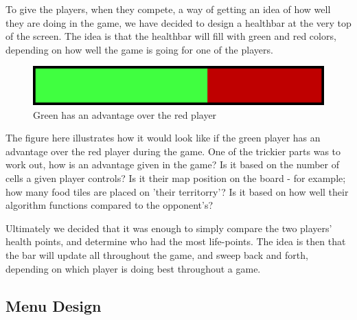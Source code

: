 To give the players, when they compete, a way of getting an idea of how well they are doing in the game, we have decided to design a healthbar at the 
very top of the screen. The idea is that the healthbar will fill with green and red colors, depending on how well the game is going for one of the 
players.

\begin{figure}[h]
	\centering
		\includegraphics{img/healthbar_example.png}
	\caption{Green has an advantage over the red player}
	\label{fig:healthbar}
\end{figure}

The figure here illustrates how it would look like if the green player has an advantage over the red player during the game. One of the trickier parts 
was to work out, how is an advantage given in the game? Is it based on the number of cells a given player controls? Is it their map position on the 
board - for example; how many food tiles are placed on 'their territorry'? Is it based on how well their algorithm functions compared to the 
opponent's? 


Ultimately we decided that it was enough to simply compare the two players' health points, and determine who had the most life-points. The idea is then 
that the bar will update all throughout the game, and sweep back and forth, depending on which player is doing best throughout a game.

\subsection{Menu Design}

